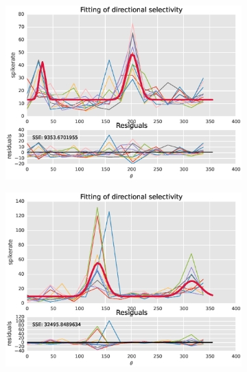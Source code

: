 \documentclass[11pt]{article}
\begin{document}
\begin{figure}
    \centering
    \begin{subfigure}{.48\textwidth}
        \centering
        \includegraphics[width=\linewidth]{plots/fit_complex1}
    \end{subfigure}
    \begin{subfigure}{.48\textwidth}
        \centering
        \includegraphics[width=\linewidth]{plots/fit_complex2}
    \end{subfigure}
    \newline
    \begin{subfigure}{.48\textwidth}
        \centering

\end{subfigure}
\end{figure}
\end{document}
